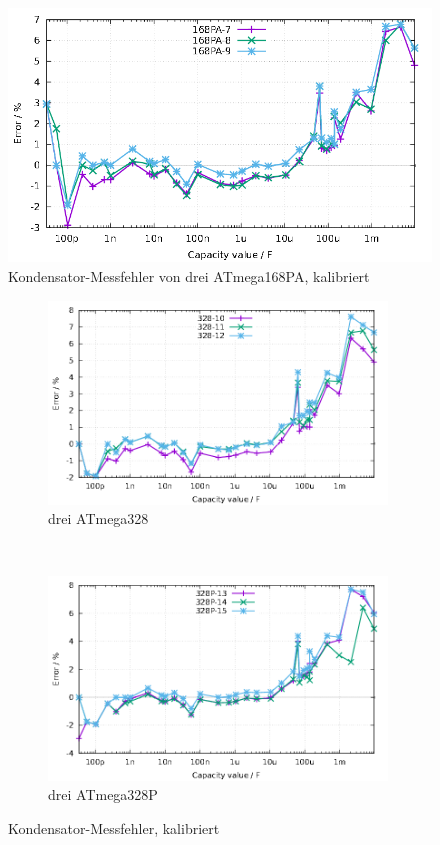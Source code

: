 \begin{figure}[H]
\centering
\includegraphics[width=16cm]{../GNU/Mega168PAcal.pdf}
\caption{Kondensator-Messfehler von drei ATmega168PA, kalibriert}
\label{fig:mega168PAcal}
\end{figure}

\begin{figure}[H]
  \begin{subfigure}[b]{9cm}
    \centering
    \includegraphics[width=9cm]{../GNU/Mega328cal.pdf}
    \caption{drei ATmega328}
    \label{fig:mega328cal}
  \end{subfigure}
  ~
  \begin{subfigure}[b]{9cm}
    \centering
    \includegraphics[width=9cm]{../GNU/Mega328Pcal.pdf}
    \caption{drei ATmega328P}
    \label{fig:mega328Pcal}
  \end{subfigure}
  \caption{Kondensator-Messfehler, kalibriert}
\end{figure}

